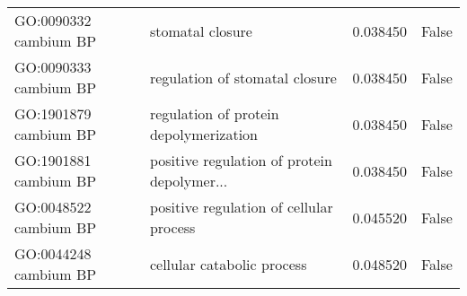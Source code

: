 \begin{tabular}{llrl}
GO:0090332 cambium BP       &                             stomatal closure &       0.038450 &  False \\
GO:0090333 cambium BP       &               regulation of stomatal closure &       0.038450 &  False \\
GO:1901879 cambium BP       &       regulation of protein depolymerization &       0.038450 &  False \\
GO:1901881 cambium BP       &  positive regulation of protein depolymer... &       0.038450 &  False \\
GO:0048522 cambium BP       &      positive regulation of cellular process &       0.045520 &  False \\
GO:0044248 cambium BP       &                   cellular catabolic process &       0.048520 &  False \\
\bottomrule
\end{tabular}
